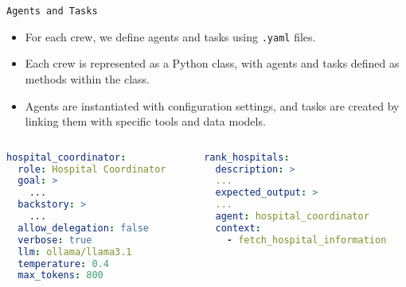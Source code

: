 \begin{frame}[fragile]{\texttt{Agents and Tasks}}
    \begin{itemize}
        \item For each crew, we define agents and tasks using \texttt{.yaml} files.
        \item Each crew is represented as a Python class, with agents and tasks defined as methods within the class.
        \item Agents are instantiated with configuration settings, and tasks are created by linking them with specific tools and data models.
    \end{itemize}
      \begin{columns}
        \begin{column}{0.48\textwidth} %
            \centering%

            \begin{lstlisting}[language=yaml, caption=\scriptsize \texttt{medical\_services/agents.yaml}]
hospital_coordinator:
  role: Hospital Coordinator
  goal: >
    ...
  backstory: >
    ...
  allow_delegation: false
  verbose: true
  llm: ollama/llama3.1
  temperature: 0.4
  max_tokens: 800

            \end{lstlisting}
        \end{column}
        \begin{column}{0.48\textwidth} %
            \centering
            \begin{lstlisting}[language=yaml, caption=\scriptsize \texttt{medical\_services/tasks.yaml}]
rank_hospitals:
  description: >
  ...
  expected_output: >
  ...
  agent: hospital_coordinator
  context:
    - fetch_hospital_information
            \end{lstlisting}
        \end{column}
      \end{columns}
\end{frame}